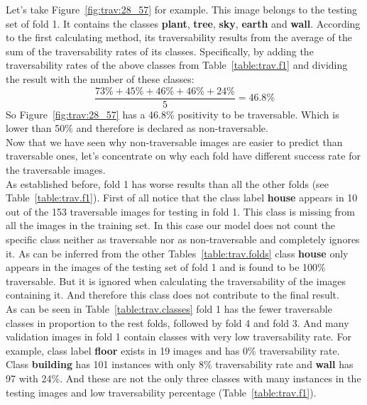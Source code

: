 \documentclass[12pt,a4paper,table,dvipsnames,tikz]{report}
\newcommand{\bl}[1]{{\hypersetup{linkcolor=blue}#1}}
\newcommand{\class}[1]{\textbf{\textcolor{#1}{#1}}} %
\begin{document}
	
	Let's take Figure~\bl{\ref{fig:trav:28_57}} for example. This image belongs to the 
	testing set of fold 1. It contains the classes \class{plant}, \class{tree}, \class{sky}, 
	\class{earth} and \class{wall}. According to the first calculating method, its 
	traversability results from the average of the sum of the traversability rates of its 
	classes. Specifically, by adding the traversability rates of the above classes from 
	Table~\bl{\ref{table:trav.f1}} and dividing the result with the number of these classes: 
	\begin{equation} \label{eq:trav_5}
	\frac{73\% + 45\% + 46\% + 46\% + 24\%}{5} = 46.8\%
	\end{equation}
	So Figure~\bl{\ref{fig:trav:28_57}} has a 46.8\% positivity to be traversable. Which is 
	lower than 50\% and therefore is declared as non-traversable.
	\\
	
	Now that we have seen why non-traversable images are easier to predict than traversable 
	ones, let's concentrate on why each fold have different success rate for the traversable 
	images.
	\\
	
	As established before, fold 1 has worse results than all the other folds (see 
	Table~\bl{\ref{table:trav.f1}}). First of all notice that the class label \class{house} 
	appears in 10 out of the 153 traversable images for testing in fold 1. This class is 
	missing from all the images in the training set. In this case our model does not count 
	the specific class neither as traversable nor as non-traversable and completely ignores 
	it. As can be inferred from the other Tables~\bl{\ref{table:trav.folds}} class 
	\class{house} only appears in the images of the testing set of fold 1 and is found to 
	be 100\% traversable. But it is ignored when calculating the traversability of the 
	images containing it. And therefore this class does not contribute to the final result.
	\\
	
	As can be seen in Table~\bl{\ref{table:trav.classes}} fold 1 has the fewer traversable 
	classes in proportion to the rest folds, followed by fold 4 and fold 3. And many validation 
	images in fold 1 contain classes with very low traversability rate. For example, class 
	label \class{floor} exists in 19 images and has 0\% traversability rate. Class \class{building} 
	has 101 instances with only 8\% traversability rate and \class{wall} has 97 with 24\%. 
	And these are not the only three classes with many instances in the testing images and 
	low traversability percentage (Table~\bl{\ref{table:trav.f1}}).
	\\
	
\end{document}
